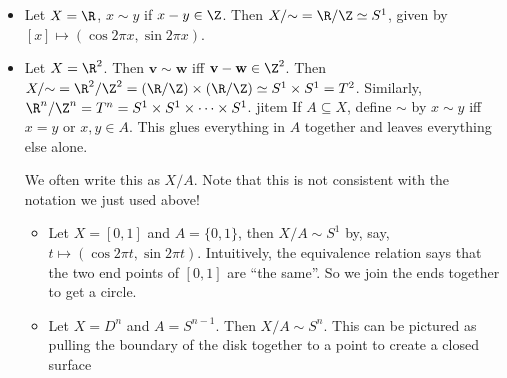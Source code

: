 \documentclass[a4paper]{article}
\begin{document}
\begin{eg}\leavevmode
  \begin{itemize}
    \item Let $X = \R$, $x\sim y$ if $x - y\in \Z$. Then $X/{\sim} = \R/\Z \simeq S^1$, given by $[x] \mapsto (\cos 2\pi x, \sin 2\pi x)$.
    \item Let $X = \R^2$. Then $\mathbf{v}\sim \mathbf{w}$ iff $\mathbf{v} - \mathbf{w} \in \Z^2$. Then $X/{\sim} = \R^2/\Z^2 = (\R/\Z)\times (\R/\Z) \simeq S^1\times S^1 = T^2$. Similarly, $\R^n/\Z^n = T^n = S^1\times S^1 \times \cdots \times S^1$.
    jitem If $A\subseteq X$, define $\sim$ by $x\sim y$ iff $x = y$ or $x, y\in A$. This glues everything in $A$ together and leaves everything else alone.

      We often write this as $X/A$. Note that this is not consistent with the notation we just used above!
      \begin{itemize}
        \item Let $X = [0, 1]$ and $A = \{0, 1\}$, then $X/A \sim S^1$ by, say, $t\mapsto (\cos 2\pi t, \sin 2\pi t)$. Intuitively, the equivalence relation says that the two end points of $[0, 1]$ are ``the same''. So we join the ends together to get a circle.
          \begin{center}
          \end{center}

        \item Let $X = D^n$ and $A = S^{n - 1}$. Then $X/A \sim S^n$. This can be pictured as pulling the boundary of the disk together to a point to create a closed surface
          \begin{center}
\end{center}
\end{itemize}
\end{itemize}
\end{eg}
\end{document}
